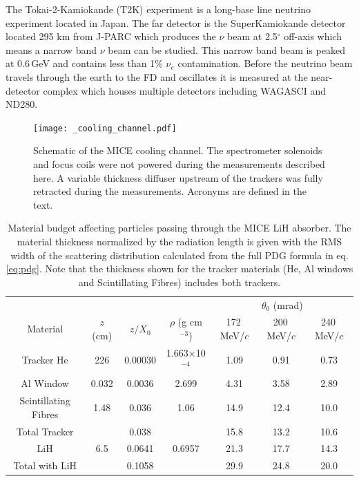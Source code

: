 \documentclass[%
 reprint,
 amsmath,amssymb,
 aps,
]{revtex4-2}
\begin{document}
The Tokai-2-Kamiokande (T2K) experiment \cite{} is a long-base line neutrino experiment located in Japan. The far detector is the SuperKamiokande detector \cite{} located 295 km from J-PARC which produces the $\nu$ beam at 2.5$^\circ$ off-axis which means a narrow band $\nu$ beam can be studied. This narrow band beam is peaked at 0.6\,GeV and contains less than 1\% $\nu_e$ contamination. Before the neutrino beam travels through the earth to the FD and oscillates it is measured at the near-detector complex which houses multiple detectors including WAGASCI and ND280. 
\begin{figure}[htbp]
\begin{center}
\texttt{[image: \_cooling\_channel.pdf]}
\end{center}
\caption{Schematic of the MICE cooling channel. The spectrometer solenoids and focus coils were not powered during the measurements described here. A variable thickness diffuser upstream of the trackers was fully retracted during the measurements. Acronyms are defined in the text.}
\label{fig:micecc}
\end{figure}

\begin{table}
\caption{Material budget affecting particles passing through the MICE LiH
  absorber. The material thickness normalized by the radiation length
  is given with the RMS width of the scattering distribution calculated from
  the full PDG formula \cite{Zyla:2020zbs} in eq. \ref{eq:pdg}. Note that the 
  thickness shown for the tracker materials (He, Al windows and Scintillating Fibres) includes 
  both trackers.}
\label{tab:RMSpred}
\vspace{3mm}
\centering
\begin{ruledtabular}
\begin{tabular}{c|ccc|ccc}
& & & & \multicolumn{3}{c}{$\theta_0$ (mrad)} \\ 
Material & $z$ (cm) & $z/X_{0}$ & $\rho$ (g cm$^{-3}$) & 172\,MeV/$c$ & 200\,MeV/$c$ & 240\, MeV/$c$ \\ 
\hline
Tracker He & 226 & 0.00030 & 1.663$\times$10$^{-4}$ & 1.09 & 0.91 & 0.73 \\ 
Al Window & 0.032 & 0.0036 & 2.699 & 4.31 & 3.58 & 2.89 \\ 
Scintillating Fibres & 1.48 & 0.036 & 1.06 & 14.9 & 12.4 & 10.0 \\
Total Tracker &  & 0.038 & & 15.8 & 13.2 & 10.6 \\
LiH & 6.5 &  0.0641 & 0.6957      & 21.3 & 17.7 & 14.3 \\ %
\hline
Total with LiH & & 0.1058 & & 29.9 & 24.8 & 20.0 \\
\end{tabular}
\end{ruledtabular}
\end{table}
\end{document}
